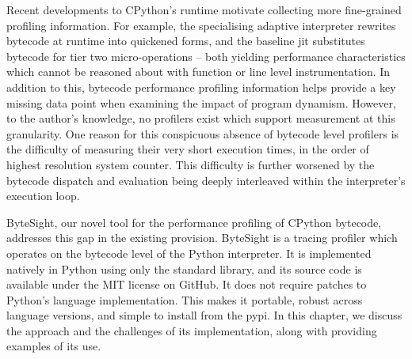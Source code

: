 


Recent developments to CPython's runtime motivate collecting more fine-grained profiling information.
For example, the specialising adaptive interpreter rewrites bytecode at runtime into quickened forms, and the baseline \ac{jit} substitutes bytecode for tier two micro-operations -- both yielding performance characteristics which cannot be reasoned about with function or line level instrumentation.
In addition to this, bytecode performance profiling information helps provide a key missing data point when examining the impact of program dynamism.
However, to the author's knowledge, no profilers exist which support measurement at this granularity.
One reason for this conspicuous absence of bytecode level profilers is the difficulty of measuring their very short execution times, in the order of highest resolution system counter. This difficulty is further worsened by the bytecode dispatch and evaluation being deeply interleaved within the interpreter's execution loop.

ByteSight, our novel tool for the performance profiling of CPython bytecode, addresses this gap in the existing provision.
ByteSight is a tracing profiler which operates on the bytecode level of the Python interpreter. It is implemented natively in Python using only the standard library, and its source code is available under the MIT license on GitHub. %
It does not require patches to Python's language implementation. This makes it portable, robust across language versions, and simple to install from the \ac{pypi}. %
In this chapter, we discuss the approach and the challenges of its implementation, along with providing examples of its use.


